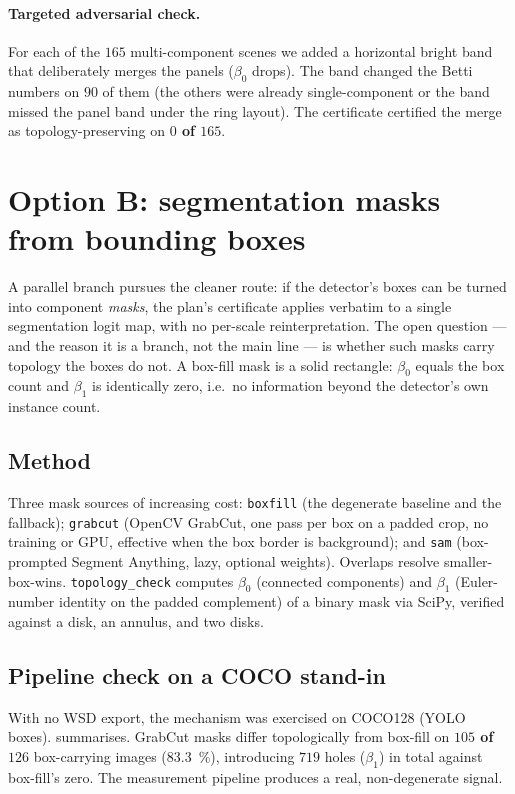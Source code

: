 \documentclass[11pt]{article}
\newcommand{\code}[1]{\texttt{\small #1}}
\newcommand{\Betti}{\beta}
\theoremstyle{definition}
\theoremstyle{plain}
\begin{document}
\paragraph{Targeted adversarial check.} For each of the $165$ multi-component
scenes we added a horizontal bright band that deliberately merges the panels
($\Betti_0$ drops). The band changed the Betti numbers on $90$ of them (the
others were already single-component or the band missed the panel band under the
ring layout). The certificate certified the merge as topology-preserving on
\textbf{$0$ of $165$}.

\section{Option B: segmentation masks from bounding boxes}
\label{sec:optionb}

A parallel branch pursues the cleaner route: if the detector's boxes can be
turned into component \emph{masks}, the plan's certificate applies verbatim to a
single segmentation logit map, with no per-scale reinterpretation. The open
question --- and the reason it is a branch, not the main line --- is whether such
masks carry topology the boxes do not. A box-fill mask is a solid rectangle:
$\Betti_0$ equals the box count and $\Betti_1$ is identically zero, i.e.\ no
information beyond the detector's own instance count.

\subsection{Method}

Three mask sources of increasing cost: \code{boxfill} (the degenerate baseline
and the fallback); \code{grabcut} (OpenCV GrabCut, one pass per box on a padded
crop, no training or GPU, effective when the box border is background); and
\code{sam} (box-prompted Segment Anything, lazy, optional weights). Overlaps
resolve smaller-box-wins. \code{topology\_check} computes $\Betti_0$ (connected
components) and $\Betti_1$ (Euler-number identity on the padded complement) of a
binary mask via SciPy, verified against a disk, an annulus, and two disks.

\subsection{Pipeline check on a COCO stand-in}

With no WSD export, the mechanism was exercised on COCO128 (YOLO boxes).
 summarises. GrabCut masks differ topologically from box-fill on
\textbf{$105$ of $126$} box-carrying images (\SI{83.3}{\percent}), introducing
$719$ holes ($\Betti_1$) in total against box-fill's zero. The measurement
pipeline produces a real, non-degenerate signal.
\end{document}
